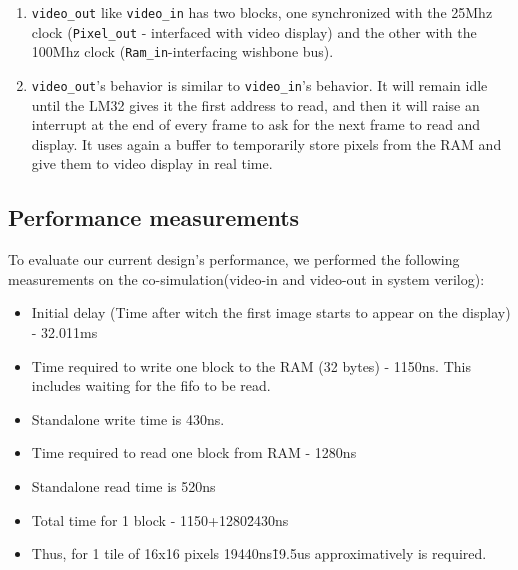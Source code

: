 \begin{enumerate}
\item \texttt{video\_out} like \texttt{video\_in} has two blocks, one synchronized with the 25Mhz clock (\texttt{Pixel\_out} - interfaced with video display) and the other with the 100Mhz clock (\texttt{Ram\_in}-interfacing wishbone bus).

\item \texttt{video\_out}'s behavior is similar to \texttt{video\_in}'s behavior. It will remain idle until the LM32 gives it the first address to read, and then it will raise an interrupt at the end of every frame to ask for the next frame to read and display. It uses again a buffer to temporarily store pixels from the RAM and give them to video display in real time. 

\end{enumerate}

\subsection{Performance measurements}

To evaluate our current design's performance, we performed the following measurements on the co-simulation(video-in and video-out in system verilog):
\begin{itemize}
\item Initial delay (Time after witch the first image starts to appear on the display) - 32.011ms
\item Time required to write one block to the RAM (32 bytes) - 1150ns.
This includes waiting for the fifo to be read.

\item Standalone write time is 430ns.

\item Time required to read one block from RAM - 1280ns
\item Standalone read time is 520ns

\item Total time for 1 block - 1150+1280\=2430ns

\item Thus, for 1 tile of 16x16 pixels 19440ns\=19.5us approximatively is required.


\end{itemize}
